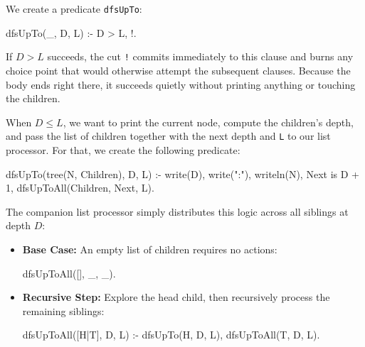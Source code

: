 


We create a predicate \texttt{dfsUpTo}:

\begin{codeblock}
dfsUpTo(_, D, L) :- 
    D > L, 
    !.
\end{codeblock}

If $D > L$ succeeds, the cut \texttt{!} commits immediately to this clause and burns any choice point that would otherwise attempt the subsequent clauses. Because the body ends right there, it succeeds quietly without printing anything or touching the children.

When $D \le L$, we want to print the current node, compute the children's depth, and pass the list of children together with the next depth and \texttt{L} to our list processor. For that, we create the following predicate:

\begin{codeblock}
dfsUpTo(tree(N, Children), D, L) :- 
    write(D), write(":"), writeln(N), 
    Next is D + 1, 
    dfsUpToAll(Children, Next, L).
\end{codeblock}

The companion list processor simply distributes this logic across all siblings at depth $D$:
\begin{itemize}
    \item \textbf{Base Case:} An empty list of children requires no actions:
\begin{codeblock}
dfsUpToAll([], _, _).
\end{codeblock}
    \item \textbf{Recursive Step:} Explore the head child, then recursively process the remaining siblings:
\begin{codeblock}
dfsUpToAll([H|T], D, L) :- 
    dfsUpTo(H, D, L),
    dfsUpToAll(T, D, L).
\end{codeblock}
\end{itemize}

